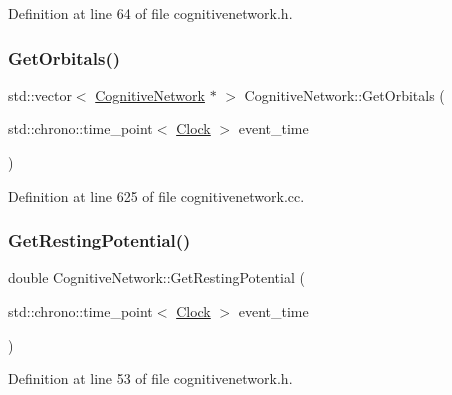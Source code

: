 Definition at line 64 of file cognitivenetwork.\+h.

\mbox{\label{class_cognitive_network_aa21d28ffc3b507236a7dad64663f6c42}} 
\subsubsection{\texorpdfstring{Get\+Orbitals()}{GetOrbitals()}}
{\footnotesize\ttfamily std\+::vector$<$ \mbox{\hyperlink{class_cognitive_network}{Cognitive\+Network}} $\ast$ $>$ Cognitive\+Network\+::\+Get\+Orbitals (\begin{DoxyParamCaption}\item[{std\+::chrono\+::time\+\_\+point$<$ \mbox{\hyperlink{universe_8h_a0ef8d951d1ca5ab3cfaf7ab4c7a6fd80}{Clock}} $>$}]{event\+\_\+time }\end{DoxyParamCaption})}



Definition at line 625 of file cognitivenetwork.\+cc.

\mbox{\label{class_cognitive_network_a03d744f9d0d420c1e044646bc6bd2552}} 
\subsubsection{\texorpdfstring{Get\+Resting\+Potential()}{GetRestingPotential()}}
{\footnotesize\ttfamily double Cognitive\+Network\+::\+Get\+Resting\+Potential (\begin{DoxyParamCaption}\item[{std\+::chrono\+::time\+\_\+point$<$ \mbox{\hyperlink{universe_8h_a0ef8d951d1ca5ab3cfaf7ab4c7a6fd80}{Clock}} $>$}]{event\+\_\+time }\end{DoxyParamCaption})\hspace{0.3cm}{\ttfamily [inline]}}



Definition at line 53 of file cognitivenetwork.\+h.

\mbox{\label{class_cognitive_network_a277247686f8af159e7a7beb0ec379225}} 

